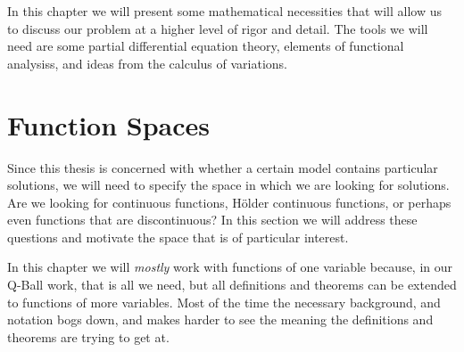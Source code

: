 In this chapter we will present some mathematical necessities that will allow us to discuss our problem at a higher level of rigor and detail. The tools we will need are some partial differential equation theory, elements of functional analysiss, and ideas from the calculus of variations.

\section{Function Spaces}\label{sec:funspaces}
Since this thesis is concerned with whether a certain model contains particular solutions, we will need to specify the space in which we are looking for solutions. Are we looking for continuous functions, H\"{o}lder continuous functions, or perhaps even functions that are discontinuous? In this section we will address these questions and motivate the space that is of particular interest.

In this chapter we will \textit{mostly} work with functions of one variable because, in our Q-Ball work, that is all we need, but all definitions and theorems can be extended to functions of more variables. Most of the time the necessary background, and notation bogs down, and makes harder to see the meaning the definitions and theorems are trying to get at.

